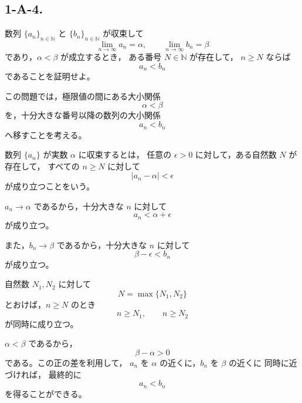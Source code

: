 \subsection{1-A-4.}
\begin{exercise}
	数列 $\{a_n\}_{n\in\mathbb{N}}$ と $\{b_n\}_{n\in\mathbb{N}}$ が収束して
	\[
		\lim_{n\to\infty} a_n=\alpha,
		\qquad
		\lim_{n\to\infty} b_n=\beta
	\]
	であり，$\alpha<\beta$ が成立するとき，
	ある番号 $N\in\mathbb{N}$ が存在して，
	$n\geq N$ ならば
	\[
		a_n<b_n
	\]
	であることを証明せよ。
\end{exercise}
\begin{background}
	この問題では，極限値の間にある大小関係
	\[
		\alpha<\beta
	\]
	を，十分大きな番号以降の数列の大小関係
	\[
		a_n<b_n
	\]
	へ移すことを考える。

	\begin{definition}[数列の収束]
		数列 $\{a_n\}$ が実数 $\alpha$ に収束するとは，
		任意の $\epsilon>0$ に対して，ある自然数 $N$ が存在して，
		すべての $n\geq N$ に対して
		\[
			|a_n-\alpha|<\epsilon
		\]
		が成り立つことをいう。
	\end{definition}

	\begin{remark}
		$a_n\to\alpha$ であるから，十分大きな $n$ に対して
		\[
			a_n<\alpha+\epsilon
		\]
		が成り立つ。

		また，$b_n\to\beta$ であるから，十分大きな $n$ に対して
		\[
			\beta-\epsilon<b_n
		\]
		が成り立つ。
	\end{remark}

	\begin{lemma}[有限個の条件を同時に満たす番号の取り方]
		自然数 $N_1,N_2$ に対して
		\[
			N=\max\{N_1,N_2\}
		\]
		とおけば，$n\geq N$ のとき
		\[
			n\geq N_1,
			\qquad
			n\geq N_2
		\]
		が同時に成り立つ。
	\end{lemma}

	\begin{remark}
		$\alpha<\beta$ であるから，
		\[
			\beta-\alpha>0
		\]
		である。この正の差を利用して，
		$a_n$ を $\alpha$ の近くに，$b_n$ を $\beta$ の近くに
		同時に近づければ，
		最終的に
		\[
			a_n<b_n
		\]
		を得ることができる。
	\end{remark}
\end{background}
